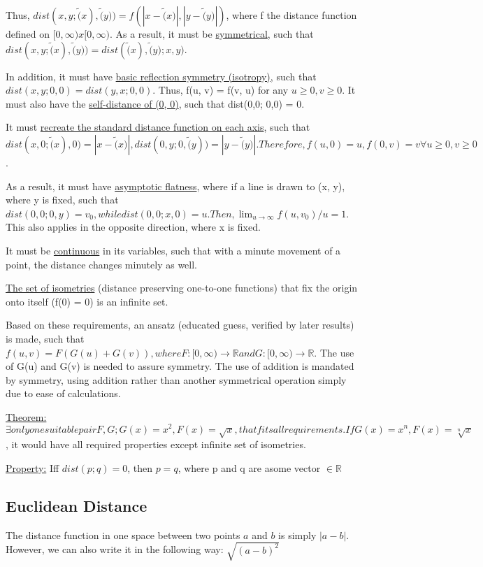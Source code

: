 \documentclass[11 pt, twoside]{article}
\begin{document}
Thus, $dist(x,y; \tilde(x), \tilde(y)) = f(|x-\tilde(x)|, |y-\tilde(y)|)$, where f the distance function defined on $[0, \infty) x [0, \infty).$ As a result, it must be \underline{symmetrical}, such that $dist(x, y; \tilde(x), \tilde(y)) = dist(\tilde(x), \tilde(y); x, y)$.

In addition, it must have \underline{basic reflection symmetry (isotropy)}, such that $dist(x, y; 0, 0) = dist(y, x; 0, 0)$. Thus, f(u, v) = f(v, u) for any $u \geq 0, v \geq 0$. It must also have the \underline{self-distance of (0, 0)}, such that dist(0,0; 0,0) = 0.

It must \underline{recreate the standard distance function on each axis}, such that $dist(x,0; \tilde(x), 0) = |x - \tilde(x)|, dist(0, y; 0, \tilde(y)) = |y - \tilde(y)|. Therefore, f(u, 0) = u, f(0, v) = v \forall u \geq 0, v \geq 0$.

As a result, it must have \underline{asymptotic flatness}, where if a line is drawn to (x, y), where y is fixed, such that $dist(0,0; 0, y) = v_0, while dist(0, 0; x, 0) = u. Then, \lim_{u \to \infty} f(u, v_0)/u = 1$. This also applies in the opposite direction, where x is fixed.

It must be \underline{continuous} in its variables, such that with a minute movement of a point, the distance changes minutely as well.

\underline{The set of isometries} (distance preserving one-to-one functions) that fix the origin onto itself (f(0) = 0) is an infinite set.

Based on these requirements, an ansatz (educated guess, verified by later results) is made, such that $f(u, v) = F(G(u) + G(v)), where F: [0, \infty) \to \mathbb{R} and G: [0, \infty) \to \mathbb{R}$. The use of G(u) and G(v) is needed to assure symmetry. The use of addition is mandated by symmetry, using addition rather than another symmetrical operation simply due to ease of calculations.

\underline{Theorem:} $\exists only one suitable pair F, G; G(x) = x^2, F(x) = \sqrt{x}, that fits all requirements. If G(x) = x^n, F(x) = \sqrt[n]{x}$, it would have all required properties except infinite set of isometries.

\underline{Property:} Iff $dist(p; q) = 0$, then $p = q$, where p and q are asome vector $\in \mathbb{R}$

\subsection{Euclidean Distance}
The distance function in one space between two points $a$ and $b$ is simply $|a
- b|$. However, we can also write it in the following way: $\sqrt{(a - b)^2}$
\end{document}
